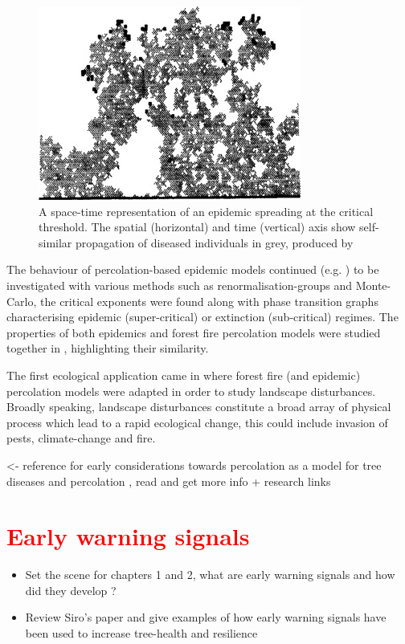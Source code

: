 \begin{figure}
    \centering
    \includegraphics{chapter2/figures/perc1.jpg}
    \caption{A space-time representation of an epidemic spreading at the critical threshold. The spatial (horizontal) and time (vertical) axis show self-similar propagation of diseased individuals in grey, produced by \cite{GRASSBERGER1986273}}
    \label{fig:1d_perc_basis}
\end{figure}

The behaviour of percolation-based epidemic models continued (e.g. \cite{pub.1060474189, pub.1059069981}) to be investigated with various methods such as renormalisation-groups and Monte-Carlo, the critical exponents were found along with phase transition graphs characterising epidemic (super-critical) or extinction (sub-critical) regimes. The properties of both epidemics and forest fire percolation models were studied together in \cite{pub.1052857560}, highlighting their similarity.

The first ecological application came in \cite{pub.1031591030} where forest fire (and epidemic) percolation models were adapted in order to study landscape disturbances. Broadly speaking, landscape disturbances constitute a broad array of physical process which lead to a rapid ecological change, this could include invasion of pests, climate-change and fire.

\textemdash \cite{GRASSBERGER1983157} <- reference for early considerations towards percolation as a model for tree diseases and percolation
\textemdash \cite{SANDER2002293}, read and get more info + research links

\section{\textcolor{red}{Early warning signals}}

\label{section:ews}
\begin{itemize}
    \item Set the scene for chapters 1 and 2, what are early warning signals and how did they develop ?
    \item Review Siro's paper and give examples of how early warning signals have been used to increase tree-health and resilience 
\end{itemize}


